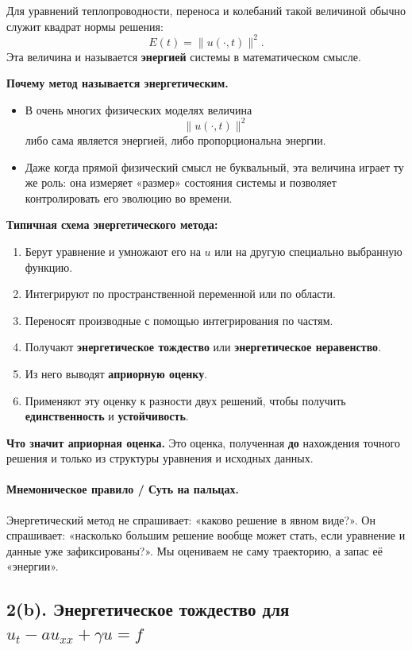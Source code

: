 \documentclass[a4paper,12pt]{article}
\begin{document}
Для уравнений теплопроводности, переноса и колебаний такой величиной обычно служит квадрат нормы решения:
\[
E(t)=\|u(\cdot,t)\|^2.
\]
Эта величина и называется \textbf{энергией} системы в математическом смысле.

\textbf{Почему метод называется энергетическим.}
\begin{itemize}
  \item В очень многих физических моделях величина
  \[
  \|u(\cdot,t)\|^2
  \]
  либо сама является энергией, либо пропорциональна энергии.
  \item Даже когда прямой физический смысл не буквальный, эта величина играет ту же роль: она измеряет «размер» состояния системы и позволяет контролировать его эволюцию во времени.
\end{itemize}

\textbf{Типичная схема энергетического метода:}
\begin{enumerate}
  \item Берут уравнение и умножают его на $u$ или на другую специально выбранную функцию.
  \item Интегрируют по пространственной переменной или по области.
  \item Переносят производные с помощью интегрирования по частям.
  \item Получают \textbf{энергетическое тождество} или \textbf{энергетическое неравенство}.
  \item Из него выводят \textbf{априорную оценку}.
  \item Применяют эту оценку к разности двух решений, чтобы получить \textbf{единственность} и \textbf{устойчивость}.
\end{enumerate}

\textbf{Что значит априорная оценка.} Это оценка, полученная \textbf{до} нахождения точного решения и только из структуры уравнения и исходных данных.

\paragraph{Мнемоническое правило / Суть на пальцах.}
Энергетический метод не спрашивает: «каково решение в явном виде?». Он спрашивает: «насколько большим решение вообще может стать, если уравнение и данные уже зафиксированы?». Мы оцениваем не саму траекторию, а запас её «энергии».

\subsection*{2(b). Энергетическое тождество для \texorpdfstring{$u_t-a u_{xx}+\gamma u=f$}{ut-a uxx+gamma u=f}}
\end{document}
